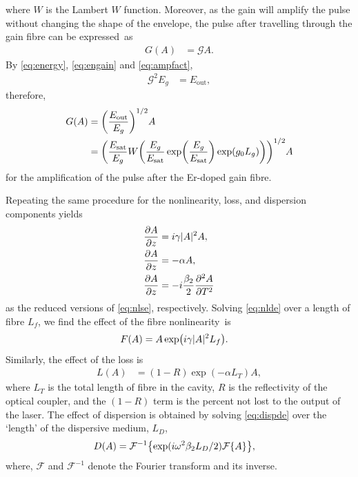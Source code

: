 \documentclass[9pt,twocolumn,twoside]{osajnl}
\let\originalleft\left
\let\originalright\right
\renewcommand{\left}{\mathopen{}\mathclose\bgroup\originalleft}
\renewcommand{\right}{\aftergroup\egroup\originalright}
\newcommand{\pdiff}[3][\hspace{-0.5pt}]{\frac{\partial^{#1}#2}{\partial{#3}^{#1}}} %
\newcommand{\Es}{E_{\textrm{sat}}} %
\newcommand{\FT}[1]{\mathcal{F}\left\{ #1 \right\}} %
\newcommand{\FTi}[1]{\mathcal{F}^{-1}\left\{ #1 \right\}} %
\begin{document}
where $W$ is the Lambert $W$ function. Moreover, as the gain will amplify the pulse without changing the shape of the envelope, the pulse after travelling through the gain fibre can be expressed~as
\begin{align}
	G(A) &= \mathcal{G} A.
	\label{eq:ampfact}
\end{align}
By \eqref{eq:energy}, \eqref{eq:engain} and \eqref{eq:ampfact},
\begin{align}
	\mathcal{G}^2 E_g &= E_\text{out},
\end{align}
therefore,
\begin{align}
	G(A) &= \left( \frac{E_\text{out}}{E_g} \right)^{1/2} A \\
	&=	\left( \frac{\Es}{E_g} W \left( \frac{E_g}{\Es} \exp \left( \frac{E_g}{\Es} \right) \exp( g_0 L_g ) \right) \right)^{1/2} A \label{eq:dimgain}
\end{align}
for the amplification of the pulse after the Er-doped gain fibre.

Repeating the same procedure for the nonlinearity, loss, and dispersion components yields
\begin{align}
	\pdiff{A}{z} &= i \gamma |A|^2 A, \label{eq:nlde} \\
	\pdiff{A}{z} &= - \alpha A,  \label{eq:lossde} \\
	\pdiff{A}{z} &= - i \frac{\beta_2}{2} \pdiff[2]{A}{T} \label{eq:dispde}
\end{align}
as the reduced versions of \eqref{eq:nlse}, respectively. Solving \eqref{eq:nlde} over a length of fibre $L_f$, we find the effect of the fibre nonlinearity~is
\begin{align}
	F(A) &= A \exp \left( i \gamma |A|^2 L_f \right). \label{eq:dimnl}
\end{align}
Similarly, the effect of the loss is
\begin{align}
	L(A) &= (1 - R) \exp( - \alpha L_T )A, \label{eq:dimloss}
\end{align}
where $L_T$ is the total length of fibre in the cavity, $R$ is the reflectivity of the optical coupler, and the $(1 - R)$ term is the percent not lost to the output of the laser. The effect of dispersion is obtained by solving \eqref{eq:dispde} over the `length' of the dispersive medium, $L_D$,
\begin{align}
	D(A) &= \FTi{\exp( i \omega^2 \beta_2 L_D / 2 ) \FT{A}}, \label{eq:dimdisp}
\end{align}
where, $\mathcal{F}$ and $\mathcal{F}^{-1}$ denote the Fourier transform and its inverse.
\end{document}
